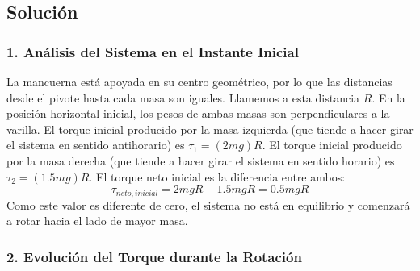 \documentclass[12pt, a4paper]{article}
\begin{document}
\subsection*{Solución}

\subsubsection*{1. Análisis del Sistema en el Instante Inicial}
La mancuerna está apoyada en su centro geométrico, por lo que las distancias desde el pivote hasta cada masa son iguales. Llamemos a esta distancia $R$. 
En la posición horizontal inicial, los pesos de ambas masas son perpendiculares a la varilla. 
El torque inicial producido por la masa izquierda (que tiende a hacer girar el sistema en sentido antihorario) es $\tau_1 = (2mg)R$.
El torque inicial producido por la masa derecha (que tiende a hacer girar el sistema en sentido horario) es $\tau_2 = (1.5mg)R$.
El torque neto inicial es la diferencia entre ambos:
$$\tau_{neto, inicial} = 2mgR - 1.5mgR = 0.5mgR$$
Como este valor es diferente de cero, el sistema no está en equilibrio y comenzará a rotar hacia el lado de mayor masa.

\subsubsection*{2. Evolución del Torque durante la Rotación}
\end{document}
